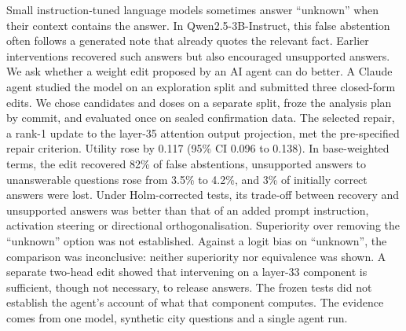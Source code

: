 Small instruction-tuned language models sometimes answer ``unknown'' when their context contains the answer.
In Qwen2.5-3B-Instruct, this false abstention often follows a generated note that already quotes the relevant fact.
Earlier interventions recovered such answers but also encouraged unsupported answers. We ask whether a weight edit proposed by an AI agent can do better. A Claude agent
studied the model on an exploration split and submitted three closed-form edits. We chose candidates and doses on a
separate split, froze the analysis plan by commit, and evaluated once on sealed confirmation data. The
selected repair, a rank-1 update to the layer-35 attention output projection, met the pre-specified repair
criterion. Utility rose by 0.117 (95\% CI 0.096 to 0.138). In base-weighted terms, the edit recovered 82\% of false abstentions,
unsupported answers to unanswerable questions rose from 3.5\% to 4.2\%, and 3\% of initially correct answers were
lost. Under Holm-corrected tests, its trade-off between recovery and
unsupported answers was better than that of an added prompt instruction, activation steering or directional
orthogonalisation. Superiority over removing the ``unknown'' option was not established. Against a logit bias on
``unknown'', the comparison was inconclusive: neither superiority nor equivalence was shown. A separate two-head edit
showed that intervening on a layer-33 component is sufficient, though not necessary, to release answers. The frozen
tests did not establish the agent's account of what that component computes. The evidence comes from one model,
synthetic city questions and a single agent run.
